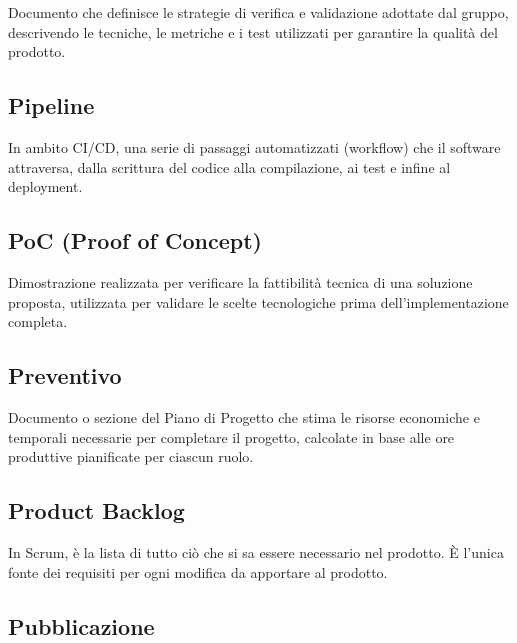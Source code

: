 \documentclass[a4paper, 11pt, oneside]{scrartcl} %
\begin{document}

Documento che definisce le strategie di verifica e validazione adottate dal gruppo, descrivendo le tecniche, le metriche e i test utilizzati per garantire la qualità del prodotto.

\vspace{0.5cm}

\subsection*{Pipeline}
In ambito CI/CD, una serie di passaggi automatizzati (workflow) che il software attraversa, dalla scrittura del codice alla compilazione, ai test e infine al deployment.
\vspace{0.5cm}

\subsection*{PoC (Proof of Concept)}


Dimostrazione realizzata per verificare la fattibilità tecnica di una soluzione proposta, utilizzata per validare le scelte tecnologiche prima dell'implementazione completa.

\vspace{0.5cm}

\subsection*{Preventivo}
Documento o sezione del Piano di Progetto che stima le risorse economiche e temporali necessarie per completare il progetto, calcolate in base alle ore produttive pianificate per ciascun ruolo.
\vspace{0.5cm}

\subsection*{Product Backlog}
In Scrum, è la lista di tutto ciò che si sa essere necessario nel prodotto. È l'unica fonte dei requisiti per ogni modifica da apportare al prodotto.
\vspace{0.5cm}

\subsection*{Pubblicazione}
\end{document}

